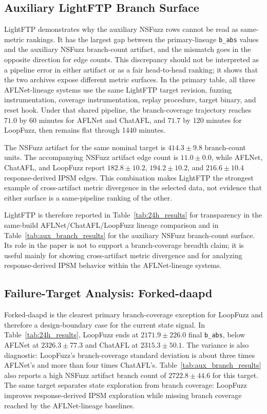 \documentclass[final,5p,times,number]{elsarticle}
\begin{document}
\subsection{Auxiliary LightFTP Branch Surface}
\label{sec:lightftp_anomaly}

LightFTP demonstrates why the auxiliary NSFuzz rows cannot be read as same-metric rankings. It has the largest gap between the primary-lineage \texttt{b\_abs} values and the auxiliary NSFuzz branch-count artifact, and the mismatch goes in the opposite direction for edge counts. This discrepancy should not be interpreted as a pipeline error in either artifact or as a fair head-to-head ranking; it shows that the two archives expose different metric surfaces. In the primary table, all three AFLNet-lineage systems use the same LightFTP target revision, fuzzing instrumentation, coverage instrumentation, replay procedure, target binary, and reset hook. Under that shared pipeline, the branch-coverage trajectory reaches $71.0$ by 60 minutes for AFLNet and ChatAFL, and $71.7$ by 120 minutes for LoopFuzz, then remains flat through 1440 minutes.

The NSFuzz artifact for the same nominal target is $414.3{\pm}9.8$ branch-count units. The accompanying NSFuzz artifact edge count is $11.0{\pm}0.0$, while AFLNet, ChatAFL, and LoopFuzz report $182.8{\pm}10.2$, $194.2{\pm}10.2$, and $216.6{\pm}10.4$ response-derived IPSM edges. This combination makes LightFTP the strongest example of cross-artifact metric divergence in the selected data, not evidence that either surface is a same-pipeline ranking of the other.

LightFTP is therefore reported in Table~\ref{tab:24h_results} for transparency in the same-build AFLNet/ChatAFL/LoopFuzz lineage comparison and in Table~\ref{tab:aux_branch_results} for the auxiliary NSFuzz branch-count surface. Its role in the paper is not to support a branch-coverage breadth claim; it is useful mainly for showing cross-artifact metric divergence and for analyzing response-derived IPSM behavior within the AFLNet-lineage systems.

\subsection{Failure-Target Analysis: Forked-daapd}
\label{sec:forked_failure}

Forked-daapd is the clearest primary branch-coverage exception for LoopFuzz and therefore a design-boundary case for the current state signal. In Table~\ref{tab:24h_results}, LoopFuzz ends at $2171.9{\pm}226.0$ final \texttt{b\_abs}, below AFLNet at $2326.3{\pm}77.3$ and ChatAFL at $2315.3{\pm}50.1$. The variance is also diagnostic: LoopFuzz's branch-coverage standard deviation is about three times AFLNet's and more than four times ChatAFL's. Table~\ref{tab:aux_branch_results} also reports a high NSFuzz artifact branch count of $2722.8{\pm}44.6$ for this target. The same target separates state exploration from branch coverage: LoopFuzz improves response-derived IPSM exploration while missing branch coverage reached by the AFLNet-lineage baselines.
\end{document}

